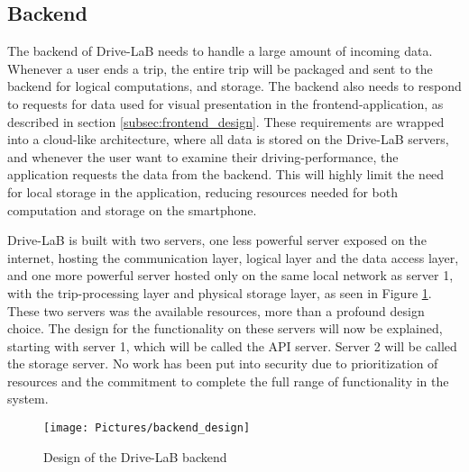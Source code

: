 \subsection{Backend}\label{subsec:backend_design}
The backend of Drive-LaB needs to handle a large amount of incoming data. Whenever a user ends a trip, the entire trip will be packaged and sent to the backend for logical computations, and storage. The backend also needs to respond to requests for data used for visual presentation in the frontend-application, as described in section \ref{subsec:frontend_design}. These requirements are wrapped into a cloud-like architecture, where all data is stored on the Drive-LaB servers, and whenever the user want to examine their driving-performance, the application requests the data from the backend. This will highly limit the need for local storage in the application, reducing resources needed for both computation and storage on the smartphone. 

Drive-LaB is built with two servers, one less powerful server exposed on the internet, hosting the communication layer, logical layer and the data access layer, and one more powerful server hosted only on the same local network as server 1, with the trip-processing layer and physical storage layer, as seen in Figure \ref{fig:backend_design}. These two servers was the available resources, more than a profound design choice. The design for the functionality on these servers will now be explained, starting with server 1, which will be called the API server. Server 2 will be called the storage server. No work has been put into security due to prioritization of resources and the commitment to complete the full range of functionality in the system.

\begin{figure}[tb]
\centering
\texttt{[image: Pictures/backend\_design]}
\caption{Design of the Drive-LaB backend}
\label{fig:backend_design}
\end{figure}